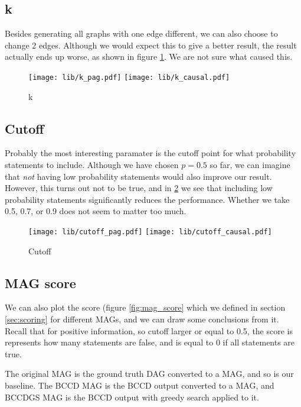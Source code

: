 \documentclass[11pt,a4paper]{report}
\begin{document}
\subsection{k}
Besides generating all graphs with one edge different, we can also choose
to change 2 edges. Although we would expect this to give a better result,
the result actually ends up worse, as shown in figure \ref{fig:k_causal}.
We are not sure what caused this.
\begin{figure}
  \centering
  \texttt{[image: lib/k\_pag.pdf]}
  \texttt{[image: lib/k\_causal.pdf]}
  \caption{k}
  \label{fig:k_causal}
\end{figure}

\subsection{Cutoff}
Probably the most interesting paramater is the cutoff point for what
probability statements to include. Although we have chosen $p=0.5$ so far,
we can imagine that \emph{not} having low probability statements would
also improve our result. However, this turns out not to be true, and in
\ref{fig:cutoff_causal} we see that including low probability statements
significantly reduces the performance. Whether we take 0.5, 0.7, or 0.9
does not seem to matter too much.
\begin{figure}
  \centering
  \texttt{[image: lib/cutoff\_pag.pdf]}
  \texttt{[image: lib/cutoff\_causal.pdf]}
  \caption{Cutoff}
  \label{fig:cutoff_causal}
\end{figure}

\subsection{MAG score}
We can also plot the score (figure \ref{fig:mag_score} which we defined in
section \ref{sec:scoring} for different MAGs, and we can draw some
conclusions from it. Recall that for positive information, so cutoff
larger or equal to 0.5, the score is represents how many statements are
false, and is equal to 0 if all statements are true.

The original MAG is the ground truth DAG converted to a MAG, and so is our
baseline. The BCCD MAG is the BCCD output converted to a MAG, and BCCDGS
MAG is the BCCD output with greedy search applied to it. 
\end{document}

